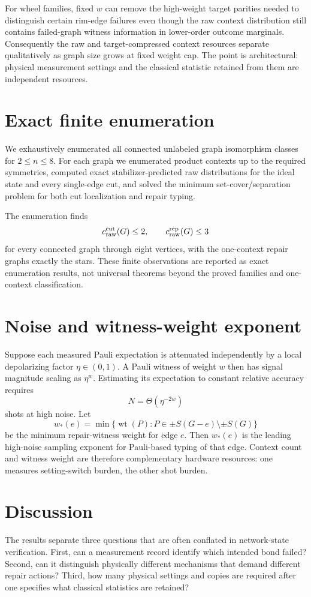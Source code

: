 \documentclass[11pt]{article}
\newcommand{\ccutraw}{c_{\rm raw}^{\rm cut}}
\newcommand{\crep}{c_{\rm raw}^{\rm rep}}
\begin{document}
For wheel families, fixed $w$ can remove the high-weight target parities needed to distinguish certain rim-edge failures even though the raw context distribution still contains failed-graph witness information in lower-order outcome marginals. Consequently the raw and target-compressed context resources separate qualitatively as graph size grows at fixed weight cap. The point is architectural: physical measurement settings and the classical statistic retained from them are independent resources.

\section{Exact finite enumeration}
We exhaustively enumerated all connected unlabeled graph isomorphism classes for $2\le n\le8$. For each graph we enumerated product contexts up to the required symmetries, computed exact stabilizer-predicted raw distributions for the ideal state and every single-edge cut, and solved the minimum set-cover/separation problem for both cut localization and repair typing.

The enumeration finds
\[
\ccutraw(G)\le2,\qquad \crep(G)\le3
\]
for every connected graph through eight vertices, with the one-context repair graphs exactly the stars. These finite observations are reported as exact enumeration results, not universal theorems beyond the proved families and one-context classification.

\section{Noise and witness-weight exponent}
Suppose each measured Pauli expectation is attenuated independently by a local depolarizing factor $\eta\in(0,1)$. A Pauli witness of weight $w$ then has signal magnitude scaling as $\eta^w$. Estimating its expectation to constant relative accuracy requires
\[
N=\Theta(\eta^{-2w})
\]
shots at high noise. Let
\[
w_*(e)=\min\{\operatorname{wt}(P):P\in\pm S(G-e)\setminus\pm S(G)\}
\]
be the minimum repair-witness weight for edge $e$. Then $w_*(e)$ is the leading high-noise sampling exponent for Pauli-based typing of that edge. Context count and witness weight are therefore complementary hardware resources: one measures setting-switch burden, the other shot burden.

\section{Discussion}
The results separate three questions that are often conflated in network-state verification. First, can a measurement record identify which intended bond failed? Second, can it distinguish physically different mechanisms that demand different repair actions? Third, how many physical settings and copies are required after one specifies what classical statistics are retained?
\end{document}
